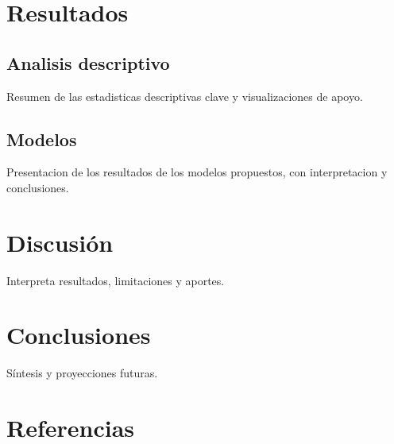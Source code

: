 \documentclass[
  spanish,
  a4paper,
  oneside]{scrbook}
\begin{document}
\chapter{Resultados}\label{resultados}

\section{Analisis descriptivo}\label{analisis-descriptivo}

Resumen de las estadisticas descriptivas clave y visualizaciones de
apoyo.

\section{Modelos}\label{modelos}

Presentacion de los resultados de los modelos propuestos, con
interpretacion y conclusiones.


\chapter{Discusión}\label{discusiuxf3n}

Interpreta resultados, limitaciones y aportes.


\chapter{Conclusiones}\label{conclusiones}

Síntesis y proyecciones futuras.


\chapter{Referencias}\label{referencias}
\end{document}
